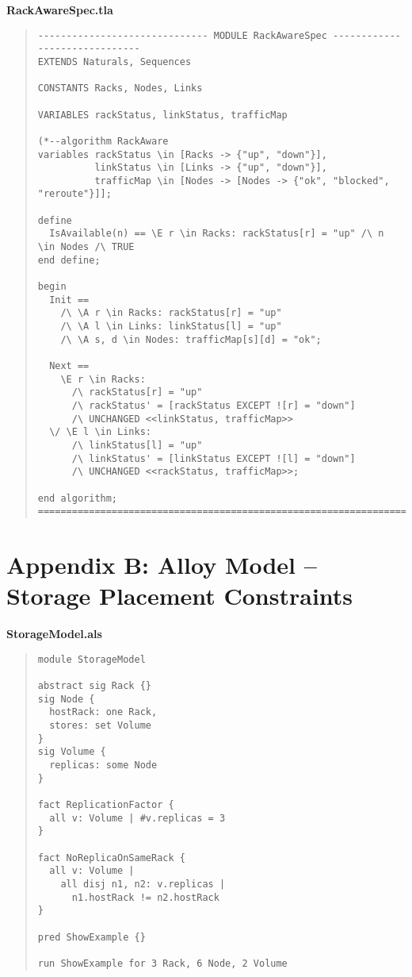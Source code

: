 \documentclass[../../../OAE-SPEC-MAIN.tex]{subfiles}
\begin{document}
\begin{marginfigure}
\footnotesize
\textbf{RackAwareSpec.tla}
\end{marginfigure}

\begin{quote}
\scriptsize
\begin{verbatim}
------------------------------ MODULE RackAwareSpec ------------------------------
EXTENDS Naturals, Sequences

CONSTANTS Racks, Nodes, Links

VARIABLES rackStatus, linkStatus, trafficMap

(*--algorithm RackAware
variables rackStatus \in [Racks -> {"up", "down"}],
          linkStatus \in [Links -> {"up", "down"}],
          trafficMap \in [Nodes -> [Nodes -> {"ok", "blocked", "reroute"}]];

define
  IsAvailable(n) == \E r \in Racks: rackStatus[r] = "up" /\ n \in Nodes /\ TRUE
end define;

begin
  Init ==
    /\ \A r \in Racks: rackStatus[r] = "up"
    /\ \A l \in Links: linkStatus[l] = "up"
    /\ \A s, d \in Nodes: trafficMap[s][d] = "ok";

  Next ==
    \E r \in Racks:
      /\ rackStatus[r] = "up"
      /\ rackStatus' = [rackStatus EXCEPT ![r] = "down"]
      /\ UNCHANGED <<linkStatus, trafficMap>>
  \/ \E l \in Links:
      /\ linkStatus[l] = "up"
      /\ linkStatus' = [linkStatus EXCEPT ![l] = "down"]
      /\ UNCHANGED <<rackStatus, trafficMap>>;

end algorithm;
===============================================================================
\end{verbatim}
\end{quote}

\section*{Appendix B: Alloy Model -- Storage Placement Constraints}

\begin{marginfigure}
\footnotesize
\textbf{StorageModel.als}
\end{marginfigure}

\begin{quote}
\scriptsize
\begin{verbatim}
module StorageModel

abstract sig Rack {}
sig Node {
  hostRack: one Rack,
  stores: set Volume
}
sig Volume {
  replicas: some Node
}

fact ReplicationFactor {
  all v: Volume | #v.replicas = 3
}

fact NoReplicaOnSameRack {
  all v: Volume |
    all disj n1, n2: v.replicas |
      n1.hostRack != n2.hostRack
}

pred ShowExample {}

run ShowExample for 3 Rack, 6 Node, 2 Volume
\end{verbatim}
\end{quote}
\end{document}
